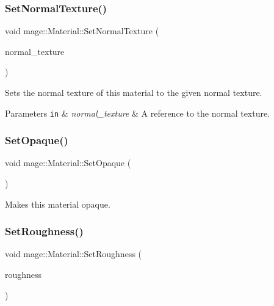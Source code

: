 \subsubsection{\texorpdfstring{Set\+Normal\+Texture()}{SetNormalTexture()}}
{\footnotesize\ttfamily void mage\+::\+Material\+::\+Set\+Normal\+Texture (\begin{DoxyParamCaption}\item[{const \hyperlink{namespacemage_a1e01ae66713838a7a67d30e44c67703e}{Shared\+Ptr}$<$ const \hyperlink{classmage_1_1_texture}{Texture} $>$ \&}]{normal\+\_\+texture }\end{DoxyParamCaption})}

Sets the normal texture of this material to the given normal texture.


\begin{DoxyParams}[1]{Parameters}
\mbox{\tt in}  & {\em normal\+\_\+texture} & A reference to the normal texture. \\
\hline
\end{DoxyParams}
\hypertarget{structmage_1_1_material_ab3c49ab54603adebb1d08803fc700fc9}{}\label{structmage_1_1_material_ab3c49ab54603adebb1d08803fc700fc9} 
\subsubsection{\texorpdfstring{Set\+Opaque()}{SetOpaque()}}
{\footnotesize\ttfamily void mage\+::\+Material\+::\+Set\+Opaque (\begin{DoxyParamCaption}{ }\end{DoxyParamCaption})\hspace{0.3cm}{\ttfamily [noexcept]}}

Makes this material opaque. \hypertarget{structmage_1_1_material_ad1df4026da1b5abc3924c7ce09a81a02}{}\label{structmage_1_1_material_ad1df4026da1b5abc3924c7ce09a81a02} 
\subsubsection{\texorpdfstring{Set\+Roughness()}{SetRoughness()}}
{\footnotesize\ttfamily void mage\+::\+Material\+::\+Set\+Roughness (\begin{DoxyParamCaption}\item[{\hyperlink{namespacemage_aa97e833b45f06d60a0a9c4fc22ae02c0}{F32}}]{roughness }\end{DoxyParamCaption})\hspace{0.3cm}{\ttfamily [noexcept]}}

